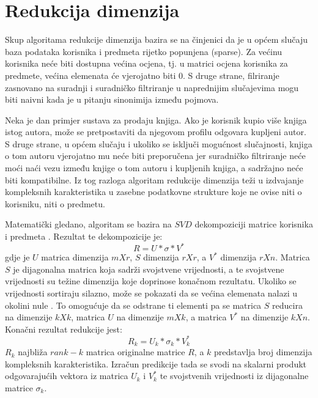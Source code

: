\documentclass[times, utf8, diplomski, numeric]{fer}
\begin{document}
\section{Redukcija dimenzija}
Skup algoritama redukcije dimenzija bazira se na činjenici da je u općem slučaju
baza podataka korisnika i predmeta rijetko popunjena \engl(sparse). Za većinu
korisnika neće biti dostupna većina ocjena, tj. u matrici ocjena korisnika za
predmete, većina elemenata će vjerojatno biti $0$. S druge strane, filriranje
zasnovano na suradnji i suradničko filtriranje u naprednijim slučajevima mogu
biti naivni kada je u pitanju sinonimija između pojmova. 

Neka je dan primjer sustava za prodaju knjiga. Ako je korisnik kupio više
knjiga istog autora, može se pretpostaviti da njegovom profilu odgovara kupljeni
autor. S druge strane, u općem slučaju i ukoliko se isključi mogućnost
slučajnosti, knjiga o tom autoru vjerojatno mu neće biti preporučena jer
suradničko filtriranje neće moći naći vezu između knjige o tom autoru i
kupljenih knjiga, a sadržajno neće biti kompatibilne. Iz tog razloga algoritam
redukcije dimenzija teži u izdvajanje kompleksnih karakteristika u zasebne
podatkovne strukture koje ne ovise niti o korisniku, niti o predmetu.

Matematički gledano, algoritam se bazira na $SVD$ dekompoziciji matrice
korisnika i predmeta . Rezultat te
dekompozicije je:
\begin{equation}
	\label{eq:svd}
	R = U \ast \sigma \ast V^{\ast}
\end{equation}
gdje je $U$ matrica dimenzija $m X r$, $S$ dimenzija $r X r$, a $V^{\ast}$
dimenzija $r X n$. Matrica $S$ je dijagonalna matrica koja sadrži svojstvene
vrijednosti, a te svojstvene vrijednosti su težine dimenzija koje doprinose
konačnom rezultatu. Ukoliko se vrijednosti sortiraju silazno, može se pokazati
da se većina elemenata nalazi u okolini nule \cite{courseraRC}. To omogućuje da
se odstrane ti elementi pa se matrica $S$ reducira na dimenzije $k X k$, matrica
$U$ na dimenzije $m X k$, a matrica $V^{\ast}$ na dimenzije $k X n$. Konačni
rezultat redukcije jest:
\begin{equation}
	\label{eq:svdred}
	R_k = U_k \ast \sigma_{k} \ast V^{\ast}_{k}
\end{equation}
$R_k$ najbliža $rank-k$ matrica originalne matrice $R$, a $k$ predstavlja broj
dimenzija kompleksnih karakteristika.
Izračun predikcije tada se svodi na skalarni produkt odgovarajućih vektora iz
matrica $U_k$ i $V^{\ast}_{k}$ te svojstvenih vrijednosti iz dijagonalne matrice
$\sigma_{k}$.
\end{document}

